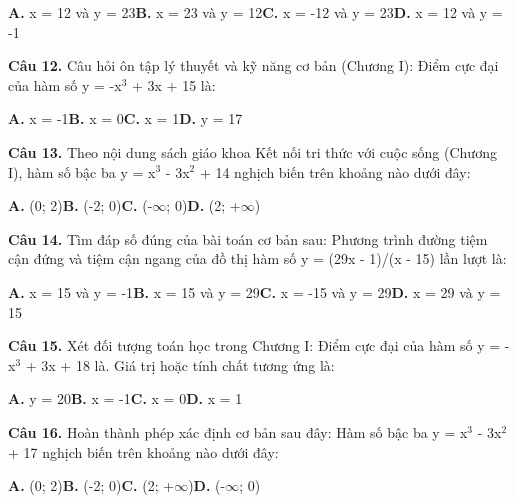 \documentclass[11pt,a4paper]{article}
\begin{document}
\hspace*{1.5em}\textbf{A.} x = 12 và y = 23\quad\quad \textbf{B.} x = 23 và y = 12\quad\quad \textbf{C.} x = -12 và y = 23\quad\quad \textbf{D.} x = 12 và y = -1\par\vspace{2pt}
\textbf{\color{primary} Câu 12.} Câu hỏi ôn tập lý thuyết và kỹ năng cơ bản (Chương I): Điểm cực đại của hàm số y = -x$^3$ + 3x + 15 là:\par
\hspace*{1.5em}\textbf{A.} x = -1\quad\quad \textbf{B.} x = 0\quad\quad \textbf{C.} x = 1\quad\quad \textbf{D.} y = 17\par\vspace{2pt}
\textbf{\color{primary} Câu 13.} Theo nội dung sách giáo khoa Kết nối tri thức với cuộc sống (Chương I), hàm số bậc ba y = x$^3$ - 3x$^2$ + 14 nghịch biến trên khoảng nào dưới đây:\par
\hspace*{1.5em}\textbf{A.} (0; 2)\quad\quad \textbf{B.} (-2; 0)\quad\quad \textbf{C.} (-$\infty$; 0)\quad\quad \textbf{D.} (2; +$\infty$)\par\vspace{2pt}
\textbf{\color{primary} Câu 14.} Tìm đáp số đúng của bài toán cơ bản sau: Phương trình đường tiệm cận đứng và tiệm cận ngang của đồ thị hàm số y = (29x - 1)/(x - 15) lần lượt là:\par
\hspace*{1.5em}\textbf{A.} x = 15 và y = -1\quad\quad \textbf{B.} x = 15 và y = 29\quad\quad \textbf{C.} x = -15 và y = 29\quad\quad \textbf{D.} x = 29 và y = 15\par\vspace{2pt}
\textbf{\color{primary} Câu 15.} Xét đối tượng toán học trong Chương I: Điểm cực đại của hàm số y = -x$^3$ + 3x + 18 là. Giá trị hoặc tính chất tương ứng là:\par
\hspace*{1.5em}\textbf{A.} y = 20\quad\quad \textbf{B.} x = -1\quad\quad \textbf{C.} x = 0\quad\quad \textbf{D.} x = 1\par\vspace{2pt}
\textbf{\color{primary} Câu 16.} Hoàn thành phép xác định cơ bản sau đây: Hàm số bậc ba y = x$^3$ - 3x$^2$ + 17 nghịch biến trên khoảng nào dưới đây:\par
\hspace*{1.5em}\textbf{A.} (0; 2)\quad\quad \textbf{B.} (-2; 0)\quad\quad \textbf{C.} (2; +$\infty$)\quad\quad \textbf{D.} (-$\infty$; 0)\par\vspace{2pt}
\end{document}
